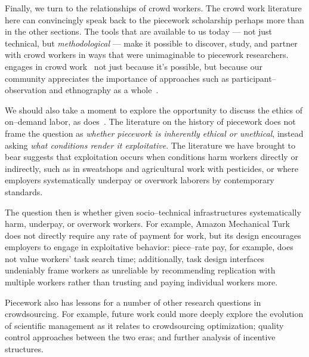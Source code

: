 \documentclass[pn4226]{subfiles}
\begin{document}
Finally, we turn to the relationships of crowd workers.
The crowd work literature here can convincingly speak back to
the piecework scholarship perhaps more than in the other sections.
The tools that are available to us today
--- not just technical, but \textit{methodological} ---
make it possible to
discover, study, and partner with 
crowd workers in ways that were unimaginable to piecework researchers.
\citeauthor{bighamHalfWorkday} engages in crowd work~\cite{bighamHalfWorkday}
not just because it's possible, but because our community
appreciates the importance of approaches such as participant--observation and ethnography as a whole~\cite{olson2014ways}.

We should also take a moment to explore the opportunity to discuss the ethics of on--demand labor,
as \citeauthor{williamson2016} does~\cite{williamson2016}.
The literature on the history of piecework does not
frame the question as \textit{whether piecework is inherently ethical or unethical},
instead asking \textit{what conditions render it exploitative}.
The literature we have brought to bear suggests that exploitation occurs when
conditions harm workers directly or indirectly, such as
in sweatshops and agricultural work with pesticides, or where
employers systematically underpay or overwork laborers by contemporary standards.

The question then is
whether given socio--technical infrastructures 
systematically harm, underpay, or overwork workers.
For example, Amazon Mechanical Turk does not directly require any rate of payment for work,
but its design encourages employers to engage in exploitative behavior:
piece--rate pay, for example, does not value workers' task search time;
additionally, task design interfaces undeniably frame
workers as unreliable by recommending
replication with multiple workers rather than
trusting and paying individual workers more.


Piecework also has lessons for a number of other research questions in crowdsourcing.
For example, future work could more deeply explore the evolution of
scientific management as it relates to
crowdsourcing optimization;
quality control approaches between the two eras; and
further analysis of incentive structures.
\end{document}
